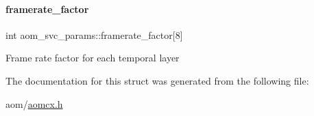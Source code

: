 \paragraph{\texorpdfstring{framerate\+\_\+factor}{framerate\_factor}}
{\footnotesize\ttfamily int aom\+\_\+svc\+\_\+params\+::framerate\+\_\+factor\mbox{[}8\mbox{]}}

Frame rate factor for each temporal layer 

The documentation for this struct was generated from the following file\+:\begin{DoxyCompactItemize}
\item 
aom/\hyperlink{aomcx_8h}{aomcx.\+h}\end{DoxyCompactItemize}
